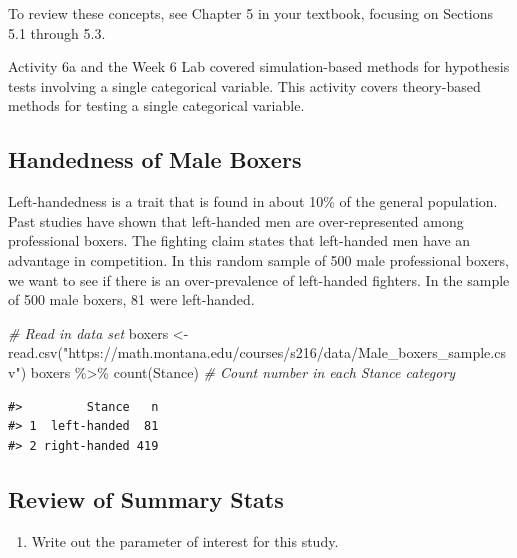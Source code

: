\documentclass[
]{report}
\newenvironment{Shaded}{\begin{snugshade}}{\end{snugshade}}
\newcommand{\CommentTok}[1]{\textcolor[rgb]{0.56,0.35,0.01}{\textit{#1}}}
\newcommand{\FunctionTok}[1]{\textcolor[rgb]{0.00,0.00,0.00}{#1}}
\newcommand{\NormalTok}[1]{#1}
\newcommand{\OtherTok}[1]{\textcolor[rgb]{0.56,0.35,0.01}{#1}}
\newcommand{\SpecialCharTok}[1]{\textcolor[rgb]{0.00,0.00,0.00}{#1}}
\newcommand{\StringTok}[1]{\textcolor[rgb]{0.31,0.60,0.02}{#1}}
\providecommand{\tightlist}{%
  \setlength{\itemsep}{0pt}\setlength{\parskip}{0pt}}
\begin{document}
To review these concepts, see Chapter 5 in your textbook, focusing on Sections 5.1 through 5.3.

Activity 6a and the Week 6 Lab covered simulation-based methods for hypothesis tests involving a single categorical variable. This activity covers theory-based methods for testing a single categorical variable.

\hypertarget{handedness-of-male-boxers}{%
\subsection{Handedness of Male Boxers}\label{handedness-of-male-boxers}}

Left-handedness is a trait that is found in about 10\% of the general population. Past studies have shown that left-handed men are over-represented among professional boxers. The fighting claim states that left-handed men have an advantage in competition. In this random sample of 500 male professional boxers, we want to see if there is an over-prevalence of left-handed fighters. In the sample of 500 male boxers, 81 were left-handed.

\begin{Shaded}
\begin{Highlighting}[]
 \CommentTok{\# Read in data set}
\NormalTok{boxers }\OtherTok{\textless{}{-}} \FunctionTok{read.csv}\NormalTok{(}\StringTok{"https://math.montana.edu/courses/s216/data/Male\_boxers\_sample.csv"}\NormalTok{)}
\NormalTok{boxers }\SpecialCharTok{\%\textgreater{}\%} \FunctionTok{count}\NormalTok{(Stance)  }\CommentTok{\# Count number in each Stance category}
\end{Highlighting}
\end{Shaded}

\begin{verbatim}
#>         Stance   n
#> 1  left-handed  81
#> 2 right-handed 419
\end{verbatim}

\hypertarget{review-of-summary-stats}{%
\subsection*{Review of Summary Stats}\label{review-of-summary-stats}}

\begin{enumerate}
\def\labelenumi{\arabic{enumi}.}
\tightlist
\item
  Write out the parameter of interest for this study.
\end{enumerate}
\end{document}
